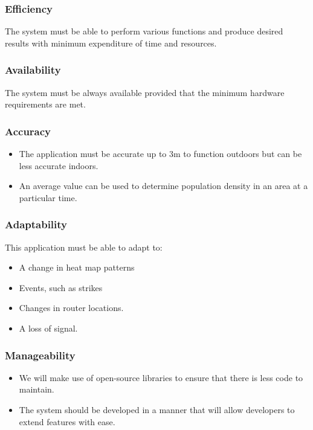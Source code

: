\documentclass[english]{article}
\begin{document}
				\subsubsection{Efficiency}
				    The system must be able to perform various functions and produce desired results with minimum expenditure of time and resources.
				    
				\subsubsection{Availability}
				    The system must be always available provided that the minimum hardware requirements are met.
    				    
				\subsubsection{Accuracy}
    				\begin{itemize}
							\item
							The application must be accurate up to 3m to function outdoors but can be less accurate indoors.
							\item
							An average value can be used to determine population density in an area at a particular time. 
						\end{itemize}
						
				\subsubsection{Adaptability}
				
							This application must be able to adapt to:
							  \begin{itemize}
								\item A change in heat map patterns
								\item Events, such as strikes
								\item Changes in router locations.
								\item A loss of signal.
							\end{itemize}
						
				\subsubsection{Manageability}
					\begin{itemize}
							\item We will make use of open-source libraries to ensure that there is less code to maintain.
							\item The system should be developed in a manner that will allow developers to extend features with ease.
						\end{itemize}
						
\end{document}
